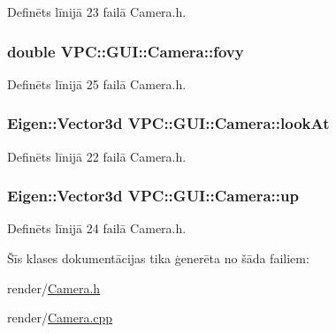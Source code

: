 Definēts līnijā 23 failā Camera.\+h.

\subsubsection[{\texorpdfstring{fovy}{fovy}}]{\setlength{\rightskip}{0pt plus 5cm}double V\+P\+C\+::\+G\+U\+I\+::\+Camera\+::fovy\hspace{0.3cm}{\ttfamily [private]}}\hypertarget{class_v_p_c_1_1_g_u_i_1_1_camera_a34f22355b6221876ea44fbfd866471b1}{}\label{class_v_p_c_1_1_g_u_i_1_1_camera_a34f22355b6221876ea44fbfd866471b1}


Definēts līnijā 25 failā Camera.\+h.

\subsubsection[{\texorpdfstring{look\+At}{lookAt}}]{\setlength{\rightskip}{0pt plus 5cm}Eigen\+::\+Vector3d V\+P\+C\+::\+G\+U\+I\+::\+Camera\+::look\+At\hspace{0.3cm}{\ttfamily [private]}}\hypertarget{class_v_p_c_1_1_g_u_i_1_1_camera_a41fa78ce129c9f56edc54f0cf7c8d60a}{}\label{class_v_p_c_1_1_g_u_i_1_1_camera_a41fa78ce129c9f56edc54f0cf7c8d60a}


Definēts līnijā 22 failā Camera.\+h.

\subsubsection[{\texorpdfstring{up}{up}}]{\setlength{\rightskip}{0pt plus 5cm}Eigen\+::\+Vector3d V\+P\+C\+::\+G\+U\+I\+::\+Camera\+::up\hspace{0.3cm}{\ttfamily [private]}}\hypertarget{class_v_p_c_1_1_g_u_i_1_1_camera_a92bf7bde4d049ff9b23a304aa562e698}{}\label{class_v_p_c_1_1_g_u_i_1_1_camera_a92bf7bde4d049ff9b23a304aa562e698}


Definēts līnijā 24 failā Camera.\+h.



Šīs klases dokumentācijas tika ģenerēta no šāda failiem\+:\begin{DoxyCompactItemize}
\item 
render/\hyperlink{_camera_8h}{Camera.\+h}\item 
render/\hyperlink{_camera_8cpp}{Camera.\+cpp}\end{DoxyCompactItemize}
